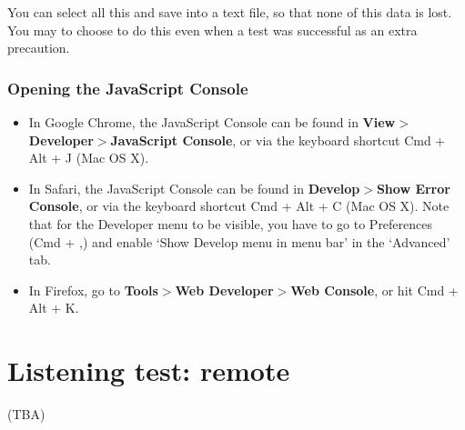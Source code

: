\documentclass[11pt, oneside]{article}   	%
\begin{document}
		You can select all this and save into a text file, so that none of this data is lost. You may to choose to do this even when a test was successful as an extra precaution. 

		\subsubsection{Opening the JavaScript Console}
            \begin{itemize}
                \item In Google Chrome, the JavaScript Console can be found in \textbf{View$>$Developer$>$JavaScript Console}, or via the keyboard shortcut Cmd + Alt + J (Mac OS X). 
                \item In Safari, the JavaScript Console can be found in \textbf{Develop$>$Show Error Console}, or via the keyboard shortcut Cmd + Alt + C (Mac OS X). Note that for the Developer menu to be visible, you have to go to Preferences (Cmd + ,) and enable `Show Develop menu in menu bar' in the `Advanced' tab. 
                \item In Firefox, go to \textbf{Tools$>$Web Developer$>$Web Console}, or hit Cmd + Alt + K. 
            \end{itemize}

\clearpage
\section{Listening test: remote}

	(TBA)

\clearpage

{}
\end{document}
